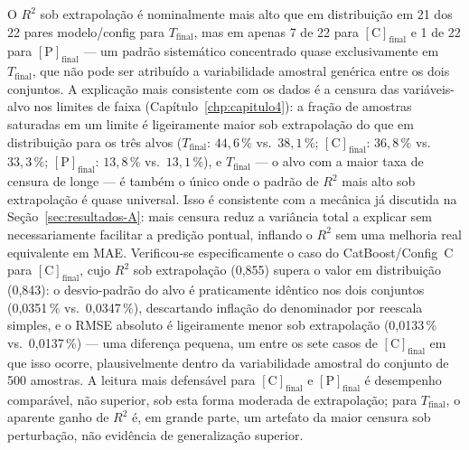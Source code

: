 O $R^2$ sob extrapolação é nominalmente mais alto que em distribuição em 21 dos 22 pares modelo/config para $T_\text{final}$, mas em apenas 7 de 22 para $[\text{C}]_\text{final}$ e 1 de 22 para $[\text{P}]_\text{final}$ --- um padrão sistemático concentrado quase exclusivamente em $T_\text{final}$, que não pode ser atribuído a variabilidade amostral genérica entre os dois conjuntos. A explicação mais consistente com os dados é a censura das variáveis-alvo nos limites de faixa (Capítulo~\ref{chp:capitulo4}): a fração de amostras saturadas em um limite é ligeiramente maior sob extrapolação do que em distribuição para os três alvos ($T_\text{final}$: $44{,}6\,\%$ vs.\ $38{,}1\,\%$; $[\text{C}]_\text{final}$: $36{,}8\,\%$ vs.\ $33{,}3\,\%$; $[\text{P}]_\text{final}$: $13{,}8\,\%$ vs.\ $13{,}1\,\%$), e $T_\text{final}$ --- o alvo com a maior taxa de censura de longe --- é também o único onde o padrão de $R^2$ mais alto sob extrapolação é quase universal. Isso é consistente com a mecânica já discutida na Seção~\ref{sec:resultados-A}: mais censura reduz a variância total a explicar sem necessariamente facilitar a predição pontual, inflando o $R^2$ sem uma melhoria real equivalente em MAE. Verificou-se especificamente o caso do CatBoost/Config~C para $[\text{C}]_\text{final}$, cujo $R^2$ sob extrapolação (0,855) supera o valor em distribuição (0,843): o desvio-padrão do alvo é praticamente idêntico nos dois conjuntos (0,0351\,\% vs.\ 0,0347\,\%), descartando inflação do denominador por reescala simples, e o RMSE absoluto é ligeiramente menor sob extrapolação (0,0133\,\% vs.\ 0,0137\,\%) --- uma diferença pequena, um entre os sete casos de $[\text{C}]_\text{final}$ em que isso ocorre, plausivelmente dentro da variabilidade amostral do conjunto de 500 amostras. A leitura mais defensável para $[\text{C}]_\text{final}$ e $[\text{P}]_\text{final}$ é desempenho comparável, não superior, sob esta forma moderada de extrapolação; para $T_\text{final}$, o aparente ganho de $R^2$ é, em grande parte, um artefato da maior censura sob perturbação, não evidência de generalização superior.

